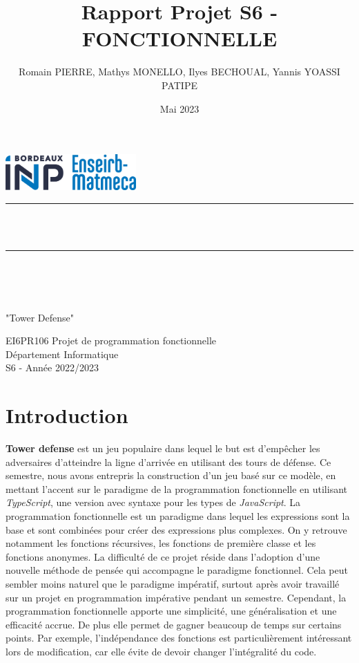 \documentclass{article}
\title{Rapport Projet S6 - FONCTIONNELLE}
\author{Romain PIERRE, Mathys MONELLO, Ilyes BECHOUAL, Yannis YOASSI PATIPE}
\date{Mai 2023}
\makeatletter
\let\mytitle\@title
\let\myauthor\@author
\let\mydate\@date
\makeatother
\begin{document}
\lstset{language=C, frame=single, basicstyle=\ttfamily, tabsize=4}

\begin{titlepage}
    \centering
    \vspace*{0.5 cm}
    \includegraphics[width=5cm]{logo.jpg}\\[1.0 cm]
    \rule{\linewidth}{0.2 mm} \\[0.4 cm]
    \huge\textbf{\mytitle}\\
    \rule{\linewidth}{0.2 mm} \\[1.5 cm]  
    \LARGE\myauthor\\[1.0 cm]
    \large\textbf{\mydate}\\[2 cm]
    \begin{center}
        \huge
        "Tower Defense"
    \end{center}

    \vspace{4cm}
    \begin{center}
    EI6PR106 Projet de programmation fonctionnelle
    \\Département Informatique
    \\S6 - Année 2022/2023
    \end{center}
 \end{titlepage}

\tableofcontents

\newpage
\section{Introduction}
\textbf{Tower defense} est un jeu populaire dans lequel le but est d'empêcher les adversaires d'atteindre la ligne d'arrivée en utilisant des tours de défense. Ce semestre, nous avons entrepris la construction d'un jeu basé sur ce modèle, en mettant l'accent sur le paradigme de la programmation fonctionnelle en utilisant \textit{TypeScript}, une version avec syntaxe pour les types de \textit{JavaScript}. La programmation fonctionnelle est un paradigme dans lequel les expressions sont la base et sont combinées pour créer des expressions plus complexes. On y retrouve notamment les fonctions récursives, les fonctions de première classe et les fonctions anonymes. La difficulté de ce projet réside dans l'adoption d'une nouvelle méthode de pensée qui accompagne le paradigme fonctionnel. Cela peut sembler moins naturel que le paradigme impératif, surtout après avoir travaillé sur un projet en programmation impérative pendant un semestre. Cependant, la programmation fonctionnelle apporte une simplicité, une généralisation et une efficacité accrue. De plus elle permet de gagner beaucoup de temps sur certains points. Par exemple, l'indépendance des fonctions est particulièrement intéressant lors de modification, car elle évite de devoir changer l'intégralité du code.
\end{document}
